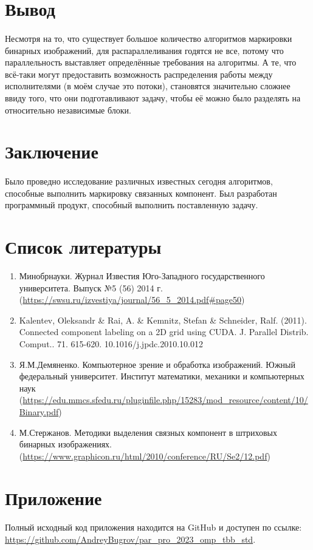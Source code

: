 \documentclass[14pt]{extarticle}
\begin{document}
\section{Вывод}
\paragraph{} Несмотря на то, что существует большое количество алгоритмов маркировки бинарных изображений, для распараллеливания годятся не все, потому что параллельность выставляет определённые требования на алгоритмы. А те, что всё-таки могут предоставить возможность распределения работы между исполнителями (в моём случае это потоки), становятся значительно сложнее ввиду того, что они подготавливают задачу, чтобы её можно было разделять на относительно независимые блоки.
\newpage
\section{Заключение}
\paragraph{} Было проведно исследование различных известных сегодня алгоритмов, способные выполнить маркировку связанных компонент. Был разработан программный продукт, способный выполнить поставленную задачу.
\newpage
\section{Список литературы}
\begin{enumerate}
    \item Минобрнауки. Журнал Известия Юго-Западного государственного университета. Выпуск №5 (56) 2014 г. (\url{https://swsu.ru/izvestiya/journal/56_5_2014.pdf#page50})
    \item Kalentev, Oleksandr \& Rai, A. \& Kemnitz, Stefan \& Schneider, Ralf. (2011). Connected component labeling on a 2D grid using CUDA. J. Parallel Distrib. Comput.. 71. 615-620. 10.1016/j.jpdc.2010.10.012
    \item Я.М.Демяненко. Компьютерное зрение и обработка изображений. Южный федеральный университет. Институт математики, механики и компьютерных наук (\url{https://edu.mmcs.sfedu.ru/pluginfile.php/15283/mod_resource/content/10/Binary.pdf})
    \item М.Стержанов. Методики выделения связных компонент в штриховых бинарных
    изображениях. (\url{https://www.graphicon.ru/html/2010/conference/RU/Se2/12.pdf})
\end{enumerate}
\newpage
\section{Приложение}
\paragraph{} Полный исходный код приложения находится на GitHub и доступен по ссылке: \url{https://github.com/AndreyBugrov/par_pro_2023_omp_tbb_std}.
\newpage
\end{document}
